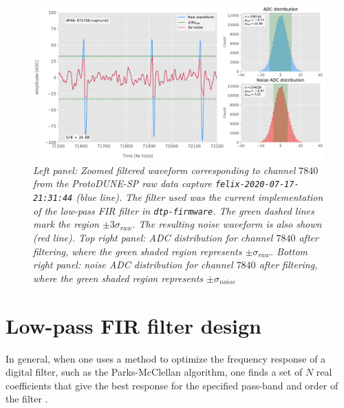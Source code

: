\begin{figure}[t]
	\centering
	\includegraphics[width=1\linewidth]{Images/Matched_Filter/waveform_example_fir}
	\caption{\textit{Left panel: Zoomed filtered waveform corresponding to channel $7840$ from the ProtoDUNE-SP raw data capture \texttt{felix-2020-07-17-21:31:44} (blue line). The filter used was the current implementation of the low-pass FIR filter in \texttt{dtp-firmware}. The green dashed lines mark the region $\pm3\sigma_{raw}$. The resulting noise waveform is also shown (red line). Top right panel: ADC distribution for channel $7840$ after filtering, where the green shaded region represents $\pm \sigma_{raw}$. Bottom right panel: noise ADC distribution for channel $7840$ after filtering, where the green shaded region represents $\pm \sigma_{noise}$}}
	\label{fig:adcs_fir}
\end{figure}

\section{Low-pass FIR filter design}
\label{sec:A.2}

In general, when one uses a method to optimize the frequency response of a digital filter, such as the Parks-McClellan algorithm, one finds a set of $N$ real coefficients that give the best response for the specified pass-band and order of the filter \cite{McClellan2005}.

